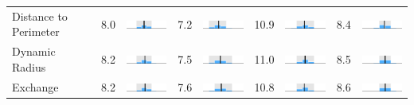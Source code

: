 \begin{table}
\begin{tabular}{l rm{7em} rm{7em} rm{7em} rm{7em}}
Distance to Perimeter  &   8.0 &     \includegraphics[width=7em]{mini_hist/PA_2000_rohrbach} &   7.2 &     \includegraphics[width=7em]{mini_hist/PA_2004_rohrbach} &  10.9 &     \includegraphics[width=7em]{mini_hist/PA_2008_rohrbach} &   8.4 &     \includegraphics[width=7em]{mini_hist/PA_2012_rohrbach} \\
Dynamic Radius         &   8.2 &   \includegraphics[width=7em]{mini_hist/PA_2000_dyn_radius} &   7.5 &   \includegraphics[width=7em]{mini_hist/PA_2004_dyn_radius} &  11.0 &   \includegraphics[width=7em]{mini_hist/PA_2008_dyn_radius} &   8.5 &   \includegraphics[width=7em]{mini_hist/PA_2012_dyn_radius} \\
Exchange               &   8.2 &     \includegraphics[width=7em]{mini_hist/PA_2000_exchange} &   7.6 &     \includegraphics[width=7em]{mini_hist/PA_2004_exchange} &  10.8 &     \includegraphics[width=7em]{mini_hist/PA_2008_exchange} &   8.6 &     \includegraphics[width=7em]{mini_hist/PA_2012_exchange} \\

\end{tabular}
\end{table}
